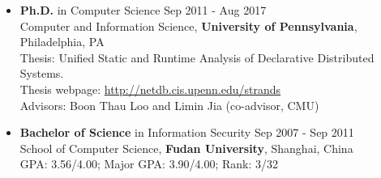 \begin{itemize}
\item {\bf Ph.D.} in Computer Science \hfill Sep 2011 - Aug 2017\\
Computer and Information Science, {\bf University of Pennsylvania}, Philadelphia, PA  \\  
Thesis: Unified Static and Runtime Analysis of Declarative Distributed Systems.\\
Thesis webpage: \url{http://netdb.cis.upenn.edu/strands}\\
Advisors: Boon Thau Loo and Limin Jia (co-advisor, CMU) \\

\item {\bf Bachelor of Science} in Information Security \hfill Sep 2007 - Sep 2011\\
School of Computer Science,
{\bf Fudan University}, Shanghai, China  \\
GPA: 3.56/4.00; Major GPA: 3.90/4.00; Rank: 3/32
\end{itemize}
